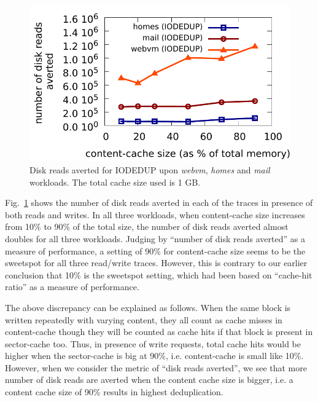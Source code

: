 \begin{figure}
    \centering
    \includegraphics[scale=0.65]{confided-figures/sweetspot/reads-writes/sweetspotaverted-reads-n-writes.pdf}
\caption{Disk reads averted for IODEDUP upon \textit{webvm}, \textit{homes} and \textit{mail} workloads. The total cache size used is 1 GB.}
\label{fig:sweetspot-averted}
\end{figure}

Fig.~\ref{fig:sweetspot-averted} shows the number of disk reads averted
in each of the traces in presence of both reads and writes.
In all three workloads, when content-cache size increases from 10\% to
90\% of the total size, the number of disk reads averted almost doubles
for all three workloads.
Judging by ``number of disk reads averted'' as a measure of performance,
a setting of 90\% for content-cache size seems to be the sweetspot
for all three read/write traces. However, this is contrary to our earlier
conclusion that 10\% is the sweetspot setting, which had been based
on ``cache-hit ratio'' as a measure of performance.

The above discrepancy can be explained as follows. When the same block
is written repeatedly with varying content, they all count as cache misses
in content-cache though they will be counted as cache hits if that
block is present in sector-cache too. Thus, in presence of write
requests, total cache hits would be higher when the sector-cache is big
at 90\%, i.e. content-cache is small like 10\%. However, when we
consider the metric of ``disk reads averted'', we see that more number
of disk reads are averted when the content cache size is
bigger, i.e. a content cache size of 90\% results in highest deduplication.

